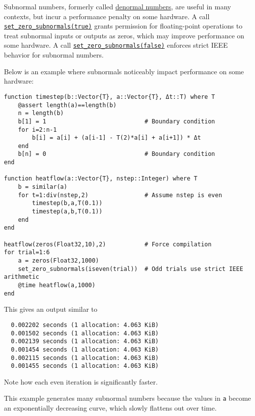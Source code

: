 Subnormal numbers, formerly called \href{https://en.wikipedia.org/wiki/Denormal\_number}{denormal numbers}, are useful in many contexts, but incur a performance penalty on some hardware. A call \hyperlink{2845950135157372113}{\texttt{set\_zero\_subnormals(true)}} grants permission for floating-point operations to treat subnormal inputs or outputs as zeros, which may improve performance on some hardware. A call \hyperlink{2845950135157372113}{\texttt{set\_zero\_subnormals(false)}} enforces strict IEEE behavior for subnormal numbers.



Below is an example where subnormals noticeably impact performance on some hardware:




\begin{verbatim}
function timestep(b::Vector{T}, a::Vector{T}, Δt::T) where T
    @assert length(a)==length(b)
    n = length(b)
    b[1] = 1                            # Boundary condition
    for i=2:n-1
        b[i] = a[i] + (a[i-1] - T(2)*a[i] + a[i+1]) * Δt
    end
    b[n] = 0                            # Boundary condition
end

function heatflow(a::Vector{T}, nstep::Integer) where T
    b = similar(a)
    for t=1:div(nstep,2)                # Assume nstep is even
        timestep(b,a,T(0.1))
        timestep(a,b,T(0.1))
    end
end

heatflow(zeros(Float32,10),2)           # Force compilation
for trial=1:6
    a = zeros(Float32,1000)
    set_zero_subnormals(iseven(trial))  # Odd trials use strict IEEE arithmetic
    @time heatflow(a,1000)
end
\end{verbatim}



This gives an output similar to




\begin{lstlisting}
  0.002202 seconds (1 allocation: 4.063 KiB)
  0.001502 seconds (1 allocation: 4.063 KiB)
  0.002139 seconds (1 allocation: 4.063 KiB)
  0.001454 seconds (1 allocation: 4.063 KiB)
  0.002115 seconds (1 allocation: 4.063 KiB)
  0.001455 seconds (1 allocation: 4.063 KiB)
\end{lstlisting}



Note how each even iteration is significantly faster.



This example generates many subnormal numbers because the values in \texttt{a} become an exponentially decreasing curve, which slowly flattens out over time.



